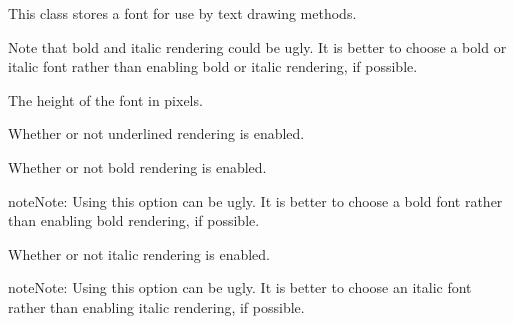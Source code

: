 \documentclass[letterpaper,10pt,english]{sphinxmanual}
\begin{document}
\begin{fulllineitems}
\label{gfx:sge.gfx.Font}
This class stores a font for use by text drawing methods.

Note that bold and italic rendering could be ugly.  It is better to
choose a bold or italic font rather than enabling bold or italic
rendering, if possible.

\begin{fulllineitems}
\label{gfx:sge.gfx.Font.size}
The height of the font in pixels.

\end{fulllineitems}


\begin{fulllineitems}
\label{gfx:sge.gfx.Font.underline}
Whether or not underlined rendering is enabled.

\end{fulllineitems}


\begin{fulllineitems}
\label{gfx:sge.gfx.Font.bold}
Whether or not bold rendering is enabled.

\begin{notice}{note}{Note:}
Using this option can be ugly.  It is better to choose a bold
font rather than enabling bold rendering, if possible.
\end{notice}

\end{fulllineitems}


\begin{fulllineitems}
\label{gfx:sge.gfx.Font.italic}
Whether or not italic rendering is enabled.

\begin{notice}{note}{Note:}
Using this option can be ugly.  It is better to choose an
italic font rather than enabling italic rendering, if
possible.
\end{notice}

\end{fulllineitems}


\end{fulllineitems}
\end{document}
